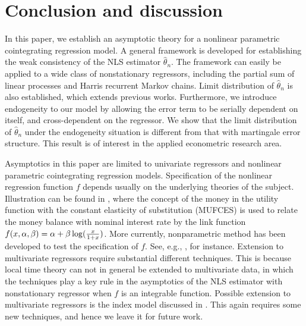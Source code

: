 
\section{Conclusion and discussion} 

In this paper, we establish an asymptotic theory for a nonlinear parametric cointegrating regression model. A general framework is developed for establishing the weak consistency of the NLS estimator $\hat{\theta}_n$. The framework can easily be applied to a wide class of nonstationary regressors, including the partial sum of linear processes and Harris recurrent Markov chains. Limit distribution of $\hat{\theta}_n$ is also established, which  extends previous works. Furthermore, we introduce endogeneity to our model by allowing the error term to be serially dependent on itself, and cross-dependent on the regressor. We show that the limit distribution of $\hat{\theta}_n$ under the endogeneity situation is different from that with martingale error structure. This result is of interest in the applied econometric research area. 

Asymptotics in this paper are limited to univariate regressors and 
nonlinear parametric cointegrating regression models. Specification of the nonlinear regression function $f$ depends usually on the underlying theories of the subject. Illustration can be found in  \cite{baekakkarogaki2004}, where  the concept of the money in the utility function with the constant elasticity of substitution (MUFCES) is used  to relate the money balance with nominal interest rate by the link function $f(x, \alpha, \beta) = \alpha + \beta \log(\frac{x}{1 + x})$. More currently, nonparametric method
 has been developed to test the specification of $f$. See, e.g., \cite{wangphillips2012},  for instance.
Extension to multivariate regressors require substantial different techniques. This is because  local time theory can not in general be extended to multivariate data, in which the techniques play a key rule in  the asymptotics of the NLS estimator with nonstationary regressor when $f$ is an integrable function.   Possible extension to multivariate regressors is the index model discussed in \cite{changpark2003}. This again requires some new techniques, and hence we leave it for future  work.


